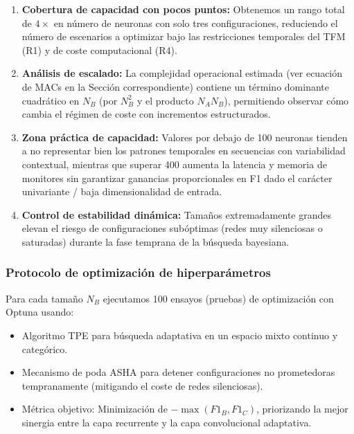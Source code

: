 \begin{enumerate}
    \item \textbf{Cobertura de capacidad con pocos puntos:} Obtenemos un rango total de $4\times$ en número de neuronas con solo tres configuraciones, reduciendo el número de escenarios a optimizar bajo las restricciones temporales del TFM (R1) y de coste computacional (R4).
    \item \textbf{Análisis de escalado:} La complejidad operacional estimada (ver ecuación de MACs en la Sección correspondiente) contiene un término dominante cuadrático en $N_B$ (por $N_B^2$ y el producto $N_A N_B$), permitiendo observar cómo cambia el régimen de coste con incrementos estructurados.
    \item \textbf{Zona práctica de capacidad:} Valores por debajo de 100 neuronas tienden a no representar bien los patrones temporales en secuencias con variabilidad contextual, mientras que superar 400 aumenta la latencia y memoria de monitores sin garantizar ganancias proporcionales en F1 dado el carácter univariante / baja dimensionalidad de entrada.
    \item \textbf{Control de estabilidad dinámica:} Tamaños extremadamente grandes elevan el riesgo de configuraciones subóptimas (redes muy silenciosas o saturadas) durante la fase temprana de la búsqueda bayesiana.
\end{enumerate}

\subsubsection{Protocolo de optimización de hiperparámetros}
Para cada tamaño $N_B$ ejecutamos 100 ensayos (pruebas) de optimización con Optuna usando:
\begin{itemize}
    \item Algoritmo TPE para búsqueda adaptativa en un espacio mixto continuo y categórico.
    \item Mecanismo de poda ASHA para detener configuraciones no prometedoras tempranamente (mitigando el coste de redes silenciosas).
    \item Métrica objetivo: Minimización de $-\max(F1_B, F1_C)$, priorizando la mejor sinergia entre la capa recurrente y la capa convolucional adaptativa.
\end{itemize}


